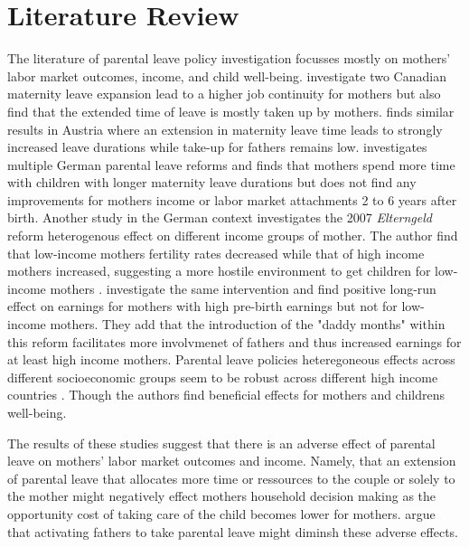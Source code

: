 \section{Literature Review}

The literature of parental leave policy investigation focusses mostly on mothers' labor market outcomes, income, and child well-being.
\citet{baker2008does} investigate two Canadian maternity leave expansion lead to a higher job continuity for mothers but also find that the
extended time of leave is mostly taken up by mothers.
\citet{laliveParentalLeaveMothers2014} finds similar results in Austria where an extension in maternity leave time leads to strongly increased leave durations
while take-up for fathers remains low.
 \citet{schonbergExpansionsMaternityLeave2014} investigates multiple German parental leave reforms and finds that mothers spend more time with children with longer
maternity leave durations but does not find any improvements for mothers income or labor market attachments 2 to 6 years after birth.
Another study in the German context investigates the 2007 \textit{Elterngeld} reform heterogenous effect on different income groups of mother. The author find that
low-income mothers fertility rates decreased while that of high income mothers increased, suggesting a more hostile environment to get children for low-income mothers
\citep{cygan-rehmParentalLeaveBenefit2016}.
\citet*{frodermannParentalLeavePolicy2023} investigate the same intervention and find positive long-run effect on earnings for mothers with high pre-birth earnings but not for low-income mothers.
They add that the introduction of the "daddy months" within this reform facilitates more involvmenet of fathers and thus increased earnings for at least
high income mothers.
Parental leave policies heteregoneous effects across different socioeconomic groups seem to be robust across different high income countries \citep{canaanMaternityLeavePaternity2022}.
Though the authors find beneficial effects for mothers and childrens well-being.

The results of these studies suggest that there is an adverse effect of parental leave on mothers' labor market outcomes and income. Namely,
that an extension of parental leave that allocates more time or ressources to the couple or solely to the mother might negatively effect mothers
household decision making as the opportunity cost of taking care of the child becomes lower for mothers.
\citet{canaanMaternityLeavePaternity2022} argue that activating fathers to take parental leave might diminsh these adverse effects.


